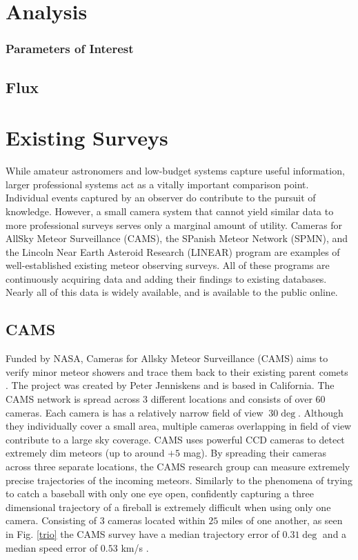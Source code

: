 \section{Analysis}

\subsubsection{Parameters of Interest}



\subsection{Flux}







\section{Existing Surveys}
While amateur astronomers and low-budget systems capture useful information, larger professional systems act as a vitally important comparison point.
Individual events captured by an observer do contribute to the pursuit of knowledge.
However, a small camera system that cannot yield similar data to more professional surveys serves only a marginal amount of utility.
Cameras for AllSky Meteor Surveillance (CAMS), the SPanish Meteor Network (SPMN), and the Lincoln Near Earth Asteroid Research (LINEAR) program are examples of well-established existing meteor observing surveys.  
All of these programs are continuously acquiring data and adding their findings to existing databases.  
Nearly all of this data is widely available, and is available to the public online. 



\subsection{CAMS}
Funded by NASA, Cameras for Allsky Meteor Surveillance (CAMS) aims to verify minor meteor showers and trace them back to their existing parent comets \cite{jenniskens_cams:_2011}.  
The project was created by Peter Jenniskens and is based in California.  
The CAMS network is spread across 3 different locations and consists of over 60 cameras.
Each camera is has a relatively narrow field of view $~30\deg$.
Although they individually cover a small area, multiple cameras overlapping in field of view contribute to a large sky coverage. 
CAMS uses powerful CCD cameras to detect extremely dim meteors (up to around $+5$ mag).
By spreading their cameras across three separate locations, the CAMS research group can measure extremely precise trajectories of the incoming meteors. 
Similarly to the phenomena of trying to catch a baseball with only one eye open, confidently capturing a three dimensional trajectory of a fireball is extremely difficult when using only one camera.
Consisting of $3$ cameras located within $25$ miles of one another, as seen in Fig. \ref{trio} the CAMS survey have a median trajectory error of $0.31\deg$ and a median speed error of $0.53$ km/s \cite{jenniskens_cams:_2011}. 

